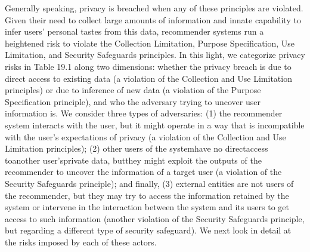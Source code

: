 Generally speaking, privacy is breached when any of these principles are violated. Given their need to collect large amounts of information and innate capability to infer users’ personal tastes from this data, recommender systems run a heightened risk to violate the Collection Limitation, Purpose Specification, Use Limitation, and Security Safeguards principles. In this light, we categorize privacy risks in Table 19.1 along two dimensions: whether the privacy breach is due to direct access to existing data (a violation of the Collection and Use Limitation principles) or due to inference of new data (a violation of the Purpose Specification principle), and who the adversary trying to uncover user information is. We consider three types of adversaries: (1) the recommender system interacts with the user, but it might operate in a way that is incompatible with the user's expectations of privacy (a violation of the Collection and Use Limitation principles); (2) other users of the systemhave no directaccess toanother user’sprivate data, butthey might exploit the outputs of the recommender to uncover the information of a target user (a violation of the Security Safeguards principle); and finally, (3) external entities are not users of the recommender, but they may try to access the information retained by the system or intervene in the interaction between the system and its users to get access to such information (another violation of the Security Safeguards principle, but regarding a different type of security safeguard). We next look in detail at the risks imposed by each of these actors.
